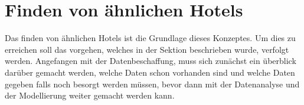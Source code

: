\section{Finden von ähnlichen Hotels}
\label{sec:find_similar}
Das finden von ähnlichen Hotels ist die Grundlage dieses Konzeptes. Um dies zu erreichen soll das vorgehen, welches in der Sektion \emph{} beschrieben wurde, verfolgt werden. Angefangen mit der Datenbeschaffung, muss sich zunächst ein überblick darüber gemacht werden, welche Daten schon vorhanden sind und welche Daten gegeben falls noch besorgt werden müssen, bevor dann mit der Datenanalyse und der Modellierung weiter gemacht werden kann. 




